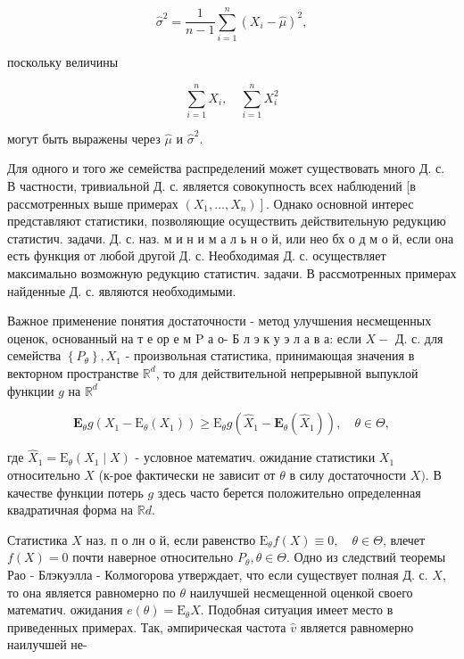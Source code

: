 \documentclass[10pt]{article}
\begin{document}
\[

\hat{\sigma}^{2}=\frac{1}{n-1} \sum_{i=1}^{n}\left(X_{i}-\hat{\mu}\right)^{2},

\]



поскольку величины



\[

\sum_{i=1}^{n} X_{i}, \quad \sum_{i=1}^{n} X_{i}^{2}

\]



могут быть выражены через $\hat{\mu}$ и $\hat{\sigma}^{2}$.



Для одного и того же семейства распределений может существовать много Д. с. В частности, тривиальной Д. с. является совокупность всех наблюдений [в рассмотренных выше примерах $\left.\left(X_{1}, \ldots, X_{n}\right)\right]$. Однако основной интерес представляют статистики, позволяющие осуществить действительную редукцию статистич. задачи. Д. с. наз. м и н и м а л ь н о й, или нео бх о д м о й, если она есть функция от любой другой Д. с. Необходимая Д. с. осуществляет максимально возможную редукцию статистич. задачи. В рассмотренных примерах найденные Д. с. являются необходимыми.



Важное применение понятия достаточности - метод улучшения несмещенных оценок, основанный на т е ор е м $\mathrm{P}$ а о- Б л э к у э л а в а: если $X-$ Д. с. для семейства $\left\{P_{\theta}\right\}, X_{1}$ - произвольная статистика, принимающая значения в векторном пространстве $\mathbb{R}^{d}$, то для действительной непрерывной выпуклой функции $g$ на $\mathbb{R}^{d}$



\[

\mathbf{E}_{\theta} g\left(X_{1}-\mathrm{E}_{\theta}\left(X_{1}\right)\right) \geqslant \mathrm{E}_{\theta} g\left(\hat{X}_{1}-\mathbf{E}_{\theta}\left(\hat{X}_{1}\right)\right), \quad \theta \in \Theta,

\]



где $\hat{X}_{1}=\mathrm{E}_{\theta}\left(X_{1} \mid X\right)$ - условное математич. ожидание статистики $X_{1}$ относительно $X$ (к-рое фактически не зависит от $\theta$ в силу достаточности $X)$. В качестве функции потерь $g$ здесь часто берется положительно определенная квадратичная форма на $\mathbb{R} d$.



Статистика $X$ наз. п о лн о й, если равенство $\mathrm{E}_{\theta} f(X) \equiv 0, \quad \theta \in \Theta$, влечет $f(X)=0$ почти наверное относительно $P_{\theta}, \theta \in \Theta$. Одно из следствий теоремы Рао - Блэкуэлла - Колмогорова утверждает, что если существует полная Д. с. $X$, то она является равномерно по $\theta$ наилучшей несмещенной оценкой своего математич. ожидания $e(\theta)=\mathrm{E}_{\theta} X$. Подобная ситуация имеет место в приведенных примерах. Так, әмпирическая частота $\hat{v}$ является равномерно наилучшей не-
\end{document}
